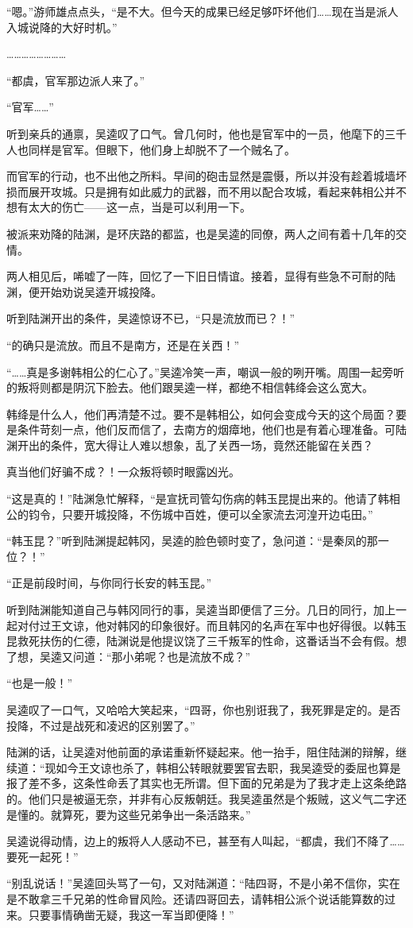 “嗯。”游师雄点点头，“是不大。但今天的成果已经足够吓坏他们……现在当是派人入城说降的大好时机。”

……………………

“都虞，官军那边派人来了。”

“官军……”

听到亲兵的通禀，吴逵叹了口气。曾几何时，他也是官军中的一员，他麾下的三千人也同样是官军。但眼下，他们身上却脱不了一个贼名了。

而官军的行动，也不出他之所料。早间的砲击显然是震慑，所以并没有趁着城墙坏损而展开攻城。只是拥有如此威力的武器，而不用以配合攻城，看起来韩相公并不想有太大的伤亡——这一点，当是可以利用一下。

被派来劝降的陆渊，是环庆路的都监，也是吴逵的同僚，两人之间有着十几年的交情。

两人相见后，唏嘘了一阵，回忆了一下旧日情谊。接着，显得有些急不可耐的陆渊，便开始劝说吴逵开城投降。

听到陆渊开出的条件，吴逵惊讶不已，“只是流放而已？！”

“的确只是流放。而且不是南方，还是在关西！”

“……真是多谢韩相公的仁心了。”吴逵冷笑一声，嘲讽一般的咧开嘴。周围一起旁听的叛将则都是阴沉下脸去。他们跟吴逵一样，都绝不相信韩绛会这么宽大。

韩绛是什么人，他们再清楚不过。要不是韩相公，如何会变成今天的这个局面？要是条件苛刻一点，他们反而信了，去南方的烟瘴地，他们也是有着心理准备。可陆渊开出的条件，宽大得让人难以想象，乱了关西一场，竟然还能留在关西？

真当他们好骗不成？！一众叛将顿时眼露凶光。

“这是真的！”陆渊急忙解释，“是宣抚司管勾伤病的韩玉昆提出来的。他请了韩相公的钧令，只要开城投降，不伤城中百姓，便可以全家流去河湟开边屯田。”

“韩玉昆？”听到陆渊提起韩冈，吴逵的脸色顿时变了，急问道：“是秦凤的那一位？！”

“正是前段时间，与你同行长安的韩玉昆。”

听到陆渊能知道自己与韩冈同行的事，吴逵当即便信了三分。几日的同行，加上一起对付过王文谅，他对韩冈的印象很好。而且韩冈的名声在军中也好得很。以韩玉昆救死扶伤的仁德，陆渊说是他提议饶了三千叛军的性命，这番话当不会有假。想了想，吴逵又问道：“那小弟呢？也是流放不成？”

“也是一般！”

吴逵叹了一口气，又哈哈大笑起来，“四哥，你也别诳我了，我死罪是定的。是否投降，不过是战死和凌迟的区别罢了。”

陆渊的话，让吴逵对他前面的承诺重新怀疑起来。他一抬手，阻住陆渊的辩解，继续道：“现如今王文谅也杀了，韩相公转眼就要罢官去职，我吴逵受的委屈也算是报了差不多，这条性命丢了其实也无所谓。但下面的兄弟是为了我才走上这条绝路的。他们只是被逼无奈，并非有心反叛朝廷。我吴逵虽然是个叛贼，这义气二字还是懂的。就算死，要为这些兄弟争出一条活路来。”

吴逵说得动情，边上的叛将人人感动不已，甚至有人叫起，“都虞，我们不降了……要死一起死！”

“别乱说话！”吴逵回头骂了一句，又对陆渊道：“陆四哥，不是小弟不信你，实在是不敢拿三千兄弟的性命冒风险。还请四哥回去，请韩相公派个说话能算数的过来。只要事情确凿无疑，我这一军当即便降！”

